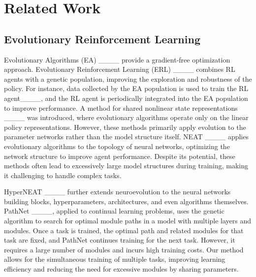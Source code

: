 \section{Related Work}
\subsection{Evolutionary Reinforcement Learning}
Evolutionary Algorithms (EA) ____ provide a gradient-free optimization approach.
Evolutionary Reinforcement Learning (ERL) ____ combines RL agents with a genetic population, improving the exploration and robustness of the policy. 
For instance, data collected by the EA population is used to train the RL agent____, and the RL agent is periodically integrated into the EA population to improve performance. 
A method for shared nonlinear state representations ____ was introduced, where evolutionary algorithms operate only on the linear policy representations.
However, these methods primarily apply evolution to the parameter networks rather than the model structure itself. 
NEAT ____ applies evolutionary algorithms to the topology of neural networks, optimizing the network structure to improve agent performance.  
Despite its potential, these methods often lead to excessively large model structures during training, making it challenging to handle complex tasks. 

HyperNEAT ____ further extends neuroevolution to the neural networks building blocks, hyperparameters, architectures, and even algorithms themselves.
PathNet ____, applied to continual learning problems, uses the genetic algorithm to search for optimal module paths in a model with multiple layers and modules. Once a task is trained, the optimal path and related modules for that task are fixed, and PathNet continues training for the next task.
However, it requires a large number of modules and incurs high training costs. 
Our method allows for the simultaneous training of multiple tasks, improving learning efficiency and reducing the need for excessive modules by sharing parameters.

